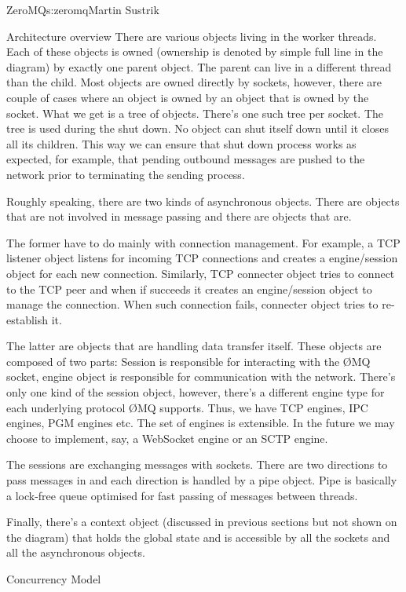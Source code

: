 \begin{aosachapter}{ZeroMQ}{s:zeromq}{Martin Sustrik}
\begin{aosasect1}{Architecture overview}
There are various objects living in the worker threads. Each of these
objects is owned (ownership is denoted by simple full line in the
diagram) by exactly one parent object. The parent can live in a
different thread than the child. Most objects are owned directly by
sockets, however, there are couple of cases where an object is owned
by an object that is owned by the socket. What we get is a tree of
objects. There's one such tree per socket. The tree is used during the
shut down. No object can shut itself down until it closes all its
children. This way we can ensure that shut down process works as
expected, for example, that pending outbound messages are pushed to
the network prior to terminating the sending process.

Roughly speaking, there are two kinds of asynchronous objects. There
are objects that are not involved in message passing and there are
objects that are.

The former have to do mainly with connection management. For example,
a TCP listener object listens for incoming TCP connections and creates
a engine/session object for each new connection. Similarly, TCP
connecter object tries to connect to the TCP peer and when if succeeds
it creates an engine/session object to manage the connection. When
such connection fails, connecter object tries to re-establish it.

The latter are objects that are handling data transfer itself. These
objects are composed of two parts: Session is responsible for
interacting with the ØMQ socket, engine object is responsible for
communication with the network. There's only one kind of the session
object, however, there's a different engine type for each underlying
protocol ØMQ supports. Thus, we have TCP engines, IPC engines, PGM
engines etc. The set of engines is extensible. In the future we may
choose to implement, say, a WebSocket engine or an SCTP engine.

The sessions are exchanging messages with sockets. There are two
directions to pass messages in and each direction is handled by a pipe
object. Pipe is basically a lock-free queue optimised for fast passing
of messages between threads.

Finally, there's a context object (discussed in previous sections but
not shown on the diagram) that holds the global state and is
accessible by all the sockets and all the asynchronous objects.

\end{aosasect1}

\begin{aosasect1}{Concurrency Model}


\end{aosasect1}
\end{aosachapter}
